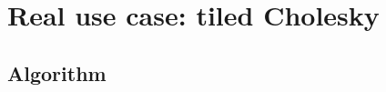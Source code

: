 \documentclass{beamer}
\begin{document}




\section{Real use case: tiled Cholesky}

\subsection{Algorithm}
\end{document}
